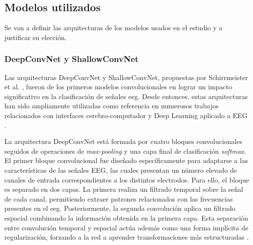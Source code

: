 
\subsection{Modelos utilizados}\label{sec:modelos_utilizados}

Se van a definir las arquitecturas de los modelos usados en el estudio y a justificar su elección.

\subsubsection{DeepConvNet y ShallowConvNet}


Las arquitecturas DeepConvNet y ShallowConvNet, propuestas por Schirrmeister et al. \cite{schirrmeister_DeepLearning2017}, fueron de los primeros modelos convolucionales en lograr un impacto significativo en la clasificación de señales \acrshort{eeg}. Desde entonces, estas arquitecturas han sido ampliamente utilizadas como referencia en numerosos trabajos relacionados con interfaces cerebro-computador y Deep Learning aplicado a EEG \cite{kollod_DeepComparisons2023}.

La arquitectura DeepConvNet está formada por cuatro bloques convolucionales seguidos de operaciones de \textit{max-pooling} y una capa final de clasificación \textit{softmax}. El primer bloque convolucional fue diseñado específicamente para adaptarse a las características de las señales EEG, las cuales presentan un número elevado de canales de entrada correspondientes a los distintos electrodos. Para ello, el bloque es separado en dos capas. La primera realiza un filtrado temporal sobre la señal de cada canal, permitiendo extraer patrones relacionados con las frecuencias presentes en el \acrshort{eeg}. Posteriormente, la segunda convolución aplica un filtrado espacial combinando la información obtenida en la primera capa. Esta separación entre convolución temporal y espacial actúa además como una forma implícita de regularización, forzando a la red a aprender transformaciones más estructuradas \cite{schirrmeister_DeepLearning2017}.


